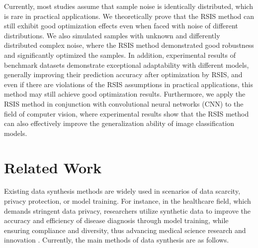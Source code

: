 \documentclass[final,3p,times]{elsarticle}
\begin{document}
Currently, most studies assume that sample noise is identically 
distributed, which is rare in practical applications. We theoretically 
prove that the RSIS method can still exhibit good optimization 
effects even when faced with noise of different distributions. We 
also simulated samples with unknown and differently distributed 
complex noise, where the RSIS method demonstrated good robustness 
and significantly optimized the samples. In addition, experimental 
results of benchmark datasets demonstrate exceptional adaptability 
with different models, generally improving their prediction accuracy 
after optimization by RSIS, and even if there are violations of the 
RSIS assumptions in practical applications, this method may still 
achieve good optimization results. Furthermore, we apply the RSIS 
method in conjunction with convolutional neural networks (CNN) to 
the field of computer vision, where experimental results show that 
the RSIS method can also effectively improve the generalization 
ability of image classification models. 





\section{Related Work}
{Existing data synthesis methods are widely used in 
scenarios of data scarcity, privacy protection, or model training. 
For instance, in the healthcare field, which demands stringent data 
privacy, researchers utilize synthetic data to improve the accuracy 
and efficiency of disease diagnosis through model training, while 
ensuring compliance and diversity, thus advancing medical science 
research and innovation \cite{bib17,bib18}. Currently, the main methods of data 
synthesis are as follows.}
\end{document}
